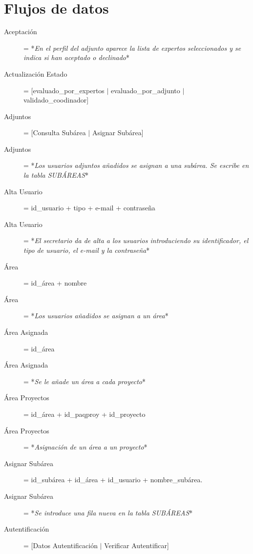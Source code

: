 \documentclass[12pt,a4paper,titlepage,spanish,twoside]{book}
\begin{document}
\section{Flujos de datos}
\begin{description}
\item[Aceptación] = *\emph{En el perfil del adjunto aparece la lista de
    expertos seleccionados y se indica si han aceptado o declinado}* 

\item[Actualización Estado] = [evaluado\_por\_expertos $\mid$
  evaluado\_por\_adjunto $\mid$ validado\_coodinador] 

\item[Adjuntos] = [Consulta Subárea $\mid$ Asignar Subárea]

\item[Adjuntos] = *\emph{Los usuarios adjuntos añadidos se asignan a una
    subárea. Se escribe en la tabla SUBÁREAS}* 
 
\item[Alta Usuario] = id\_usuario + tipo + e-mail + contraseña

\item[Alta Usuario] = *\emph{El secretario da de alta a los usuarios
    introduciendo su identificador, el tipo de usuario, el e-mail y la
    contraseña}* 

\item[Área] = id\_área + nombre

\item[Área] = *\emph{Los usuarios añadidos se asignan a un área}*

\item[Área Asignada] = id\_área

\item[Área Asignada] = *\emph{Se le añade un área a cada proyecto}*

\item[Área Proyectos] = id\_área + id\_paqproy + id\_proyecto

\item[Área Proyectos] = *\emph{Asignación de un área a un proyecto}*

\item[Asignar Subárea] = id\_subárea + id\_área + id\_usuario + nombre\_subárea.

\item[Asignar Subárea] = *\emph{Se introduce una fila nueva en la tabla
    SUBÁREAS}* 

\item[Autentificación] = [Datos Autentificación $\mid$ Verificar Autentificar]


\end{description}
\end{document}
